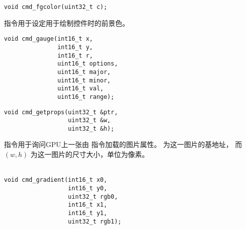 

\begin{framed}
\begin{verbatim}
void cmd_fgcolor(uint32_t c);
\end{verbatim}
\end{framed}

 指令用于设定用于绘制控件时的前景色。
\style


\begin{framed}
\begin{verbatim}
void cmd_gauge(int16_t x,
               int16_t y,
               int16_t r,
               uint16_t options,
               uint16_t major,
               uint16_t minor,
               uint16_t val,
               uint16_t range);
\end{verbatim}
\end{framed}




\begin{framed}
\begin{verbatim}
void cmd_getprops(uint32_t &ptr,
                  uint32_t &w,
                  uint32_t &h);
\end{verbatim}
\end{framed}

 指令用于询问GPU上一张由  指令加载的图片属性。
 为这一图片的基地址， 而 $(w, h)$ 为这一图片的尺寸大小，单位为像素。
\\
\\


\begin{framed}
\begin{verbatim}
void cmd_gradient(int16_t x0,
                  int16_t y0,
                  uint32_t rgb0,
                  int16_t x1,
                  int16_t y1,
                  uint32_t rgb1);
\end{verbatim}
\end{framed}

